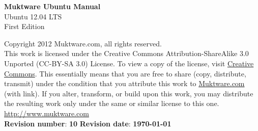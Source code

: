 \begin{titlepage}
  
\begin{center}
	{\Huge \bfseries Muktware Ubuntu Manual}\\[1cm]
	{\Large Ubuntu 12.04 LTS} \\[1cm]
	{\Large First Edition}\\ [17cm]
\end{center}

\begin{minipage}[t]{0.85\textwidth} 
 Copyright 2012 Muktware.com, all rights reserved. \\
 
 This work is licensed under the Creative Commons Attribution-ShareAlike 3.0 Unported (CC-BY-SA 3.0) License. To view a copy of the license, visit \href{http://creativecommons.org/licenses/by-sa/3.0/}{Creative Commons}. This essentially means that you are free to share (copy, distribute, transmit) under the condition that you attribute this work to \href{http://www.muktware.com/Muktware.com}{Muktware.com} (with link). If you alter, transform, or build upon this work, you may distribute the resulting work only under the same or similar license to this one. \\ 
 
\href{http://www.muktware.com}{http://www.muktware.com} \\
 
 \textbf{Revision number}: \textbf{10}	\hspace{0.5cm} \textbf{Revision date}: \textbf{ \today}
 \end{minipage}


\end{titlepage}